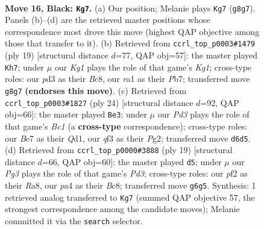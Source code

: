 \documentclass[11pt]{article}
\begin{document}
\clearpage

\begin{figure}[p]\centering
\begin{subfigure}{0.46\textwidth}\centering
\resizebox{\linewidth}{!}{%
\newchessgame
\chessboard[
  setfen={2bq1rk1/r3bp1p/p2p1np1/n1p1p3/PpB1P3/3P1Q1N/1PPB1PPP/RN2R1K1 b - - 1 16},
  showmover=false,
  pgfstyle=straightmove, color=movearrow, markmove={g8-g7}
]}
\caption{}
\end{subfigure}\hfill
\begin{subfigure}{0.46\textwidth}\centering
\resizebox{\linewidth}{!}{%
\newchessgame
\chessboard[
  setfen={r1bq1rk1/1p2ppb1/p1np1npp/2p5/P1B1P3/2PPBN1P/1P3PP1/RN1QR1K1 b - - 1 10},
  showmover=false,
  pgfstyle=straightmove, color=movearrow, markmove={g8-h7}
]}
\caption{}
\end{subfigure}
\\[4pt]
\begin{subfigure}{0.46\textwidth}\centering
\resizebox{\linewidth}{!}{%
\newchessgame
\chessboard[
  setfen={r1bq1rk1/1p3ppp/2pp1nn1/pPb1p3/P1N1P3/1BPP1N2/5PPP/R1BQ1RK1 w - - 2 13},
  showmover=false,
  pgfstyle=straightmove, color=movearrow, markmove={c1-e3}
]}
\caption{}
\end{subfigure}\hfill
\begin{subfigure}{0.46\textwidth}\centering
\resizebox{\linewidth}{!}{%
\newchessgame
\chessboard[
  setfen={r1bq1rk1/1pp2pb1/p1np1npp/P3p3/2B1P3/2PP1N1P/1P3PP1/RNBQR1K1 b - - 0 10},
  showmover=false,
  pgfstyle=straightmove, color=movearrow, markmove={d6-d5}
]}
\caption{}
\end{subfigure}
\caption{\textbf{Move 16, Black: \texttt{Kg7}.} (a) Our position; Melanie plays \texttt{Kg7} (\texttt{g8g7}). Panels (b)--(d) are the retrieved master positions whose correspondence most drove this move (highest QAP objective among those that transfer to it). (b) Retrieved from \texttt{ccrl\_top\_p0003\#1479} (ply 19) [structural distance $d$=77, QAP obj=57]: the master played \texttt{Kh7}; under $\mu$ our \emph{Kg1} plays the role of that game's \emph{Kg1}; cross-type roles: our \emph{p}d3 as their \emph{B}c8, our \emph{r}a1 as their \emph{P}b7; transferred move \texttt{g8g7} \textbf{(endorses this move)}. (c) Retrieved from \texttt{ccrl\_top\_p0003\#1827} (ply 24) [structural distance $d$=92, QAP obj=66]: the master played \texttt{Be3}; under $\mu$ our \emph{Pd3} plays the role of that game's \emph{Bc1} (a \textbf{cross-type} correspondence); cross-type roles: our \emph{B}e7 as their \emph{Q}d1, our \emph{q}f3 as their \emph{P}g2; transferred move \texttt{d6d5}. (d) Retrieved from \texttt{ccrl\_top\_p0000\#3888} (ply 19) [structural distance $d$=66, QAP obj=60]: the master played \texttt{d5}; under $\mu$ our \emph{Pg3} plays the role of that game's \emph{Pd3}; cross-type roles: our \emph{p}f2 as their \emph{R}a8, our \emph{p}a4 as their \emph{B}c8; transferred move \texttt{g6g5}. Synthesis: 1 retrieved analog transferred to \texttt{Kg7} (summed QAP objective 57, the strongest correspondence among the candidate moves); Melanie committed it via the \texttt{search} selector.}
\label{fig:thought-m31}
\end{figure}
\end{document}
